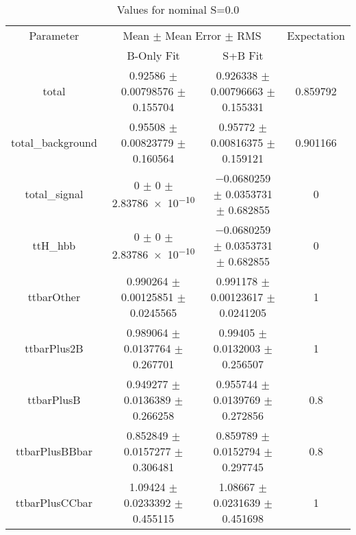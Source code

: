 \begin{table}
\centering
\caption{Values for nominal S=0.0}
\begin{tabular}{cccc}
\toprule
Parameter & \multicolumn{2}{c}{Mean $\pm$ Mean Error $\pm$ RMS} & Expectation\\
 & B-Only Fit & S+B Fit & \\
\midrule
total & \num{0.92586} $\pm$ \num{0.00798576} $\pm$ \num{0.155704} & \num{0.926338} $\pm$ \num{0.00796663} $\pm$ \num{0.155331} & \num{0.859792}\\
total\_background & \num{0.95508} $\pm$ \num{0.00823779} $\pm$ \num{0.160564} & \num{0.95772} $\pm$ \num{0.00816375} $\pm$ \num{0.159121} & \num{0.901166}\\
total\_signal & \num{0} $\pm$ \num{0} $\pm$ \num{2.83786e-10} & \num{-0.0680259} $\pm$ \num{0.0353731} $\pm$ \num{0.682855} & \num{0}\\
ttH\_hbb & \num{0} $\pm$ \num{0} $\pm$ \num{2.83786e-10} & \num{-0.0680259} $\pm$ \num{0.0353731} $\pm$ \num{0.682855} & \num{0}\\
ttbarOther & \num{0.990264} $\pm$ \num{0.00125851} $\pm$ \num{0.0245565} & \num{0.991178} $\pm$ \num{0.00123617} $\pm$ \num{0.0241205} & \num{1}\\
ttbarPlus2B & \num{0.989064} $\pm$ \num{0.0137764} $\pm$ \num{0.267701} & \num{0.99405} $\pm$ \num{0.0132003} $\pm$ \num{0.256507} & \num{1}\\
ttbarPlusB & \num{0.949277} $\pm$ \num{0.0136389} $\pm$ \num{0.266258} & \num{0.955744} $\pm$ \num{0.0139769} $\pm$ \num{0.272856} & \num{0.8}\\
ttbarPlusBBbar & \num{0.852849} $\pm$ \num{0.0157277} $\pm$ \num{0.306481} & \num{0.859789} $\pm$ \num{0.0152794} $\pm$ \num{0.297745} & \num{0.8}\\
ttbarPlusCCbar & \num{1.09424} $\pm$ \num{0.0233392} $\pm$ \num{0.455115} & \num{1.08667} $\pm$ \num{0.0231639} $\pm$ \num{0.451698} & \num{1}\\
\bottomrule
\end{tabular}
\end{table}